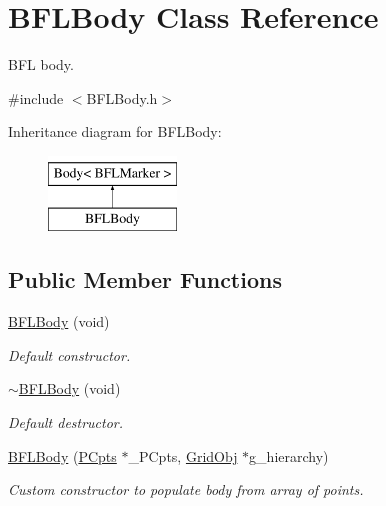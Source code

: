 \hypertarget{class_b_f_l_body}{}\section{B\+F\+L\+Body Class Reference}
\label{class_b_f_l_body}


B\+FL body.  




{\ttfamily \#include $<$B\+F\+L\+Body.\+h$>$}

Inheritance diagram for B\+F\+L\+Body\+:\begin{figure}[H]
\begin{center}
\leavevmode
\includegraphics[height=2.000000cm]{class_b_f_l_body}
\end{center}
\end{figure}
\subsection*{Public Member Functions}
\begin{DoxyCompactItemize}
\item 
\hyperlink{class_b_f_l_body_ab7b3b9f55b59b977401bcf8dead8cfce}{B\+F\+L\+Body} (void)
\begin{DoxyCompactList}\small\item\em Default constructor. \end{DoxyCompactList}\item 
\hyperlink{class_b_f_l_body_ad6d343eed8481d8b652261642e184c43}{$\sim$\+B\+F\+L\+Body} (void)
\begin{DoxyCompactList}\small\item\em Default destructor. \end{DoxyCompactList}\item 
\hyperlink{class_b_f_l_body_a5dc2907ac609b0fb0a89347b4f66f2ca}{B\+F\+L\+Body} (\hyperlink{class_p_cpts}{P\+Cpts} $\ast$\+\_\+\+P\+Cpts, \hyperlink{class_grid_obj}{Grid\+Obj} $\ast$g\+\_\+hierarchy)
\begin{DoxyCompactList}\small\item\em Custom constructor to populate body from array of points. \end{DoxyCompactList}\end{DoxyCompactItemize}

